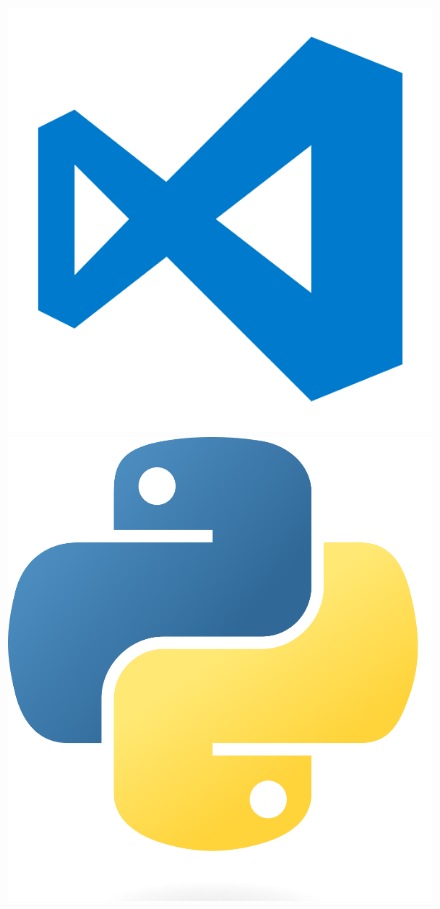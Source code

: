 \begin{figure}[h]
  \begin{minipage}[b]{0.45\linewidth}
    \centering
    \includegraphics[width=\linewidth]{images/image2.png}
  \end{minipage}
  \begin{minipage}[b]{0.45\linewidth}
    \centering
    \includegraphics[width=\linewidth]{images/image3.png}
  \end{minipage}
\end{figure}

